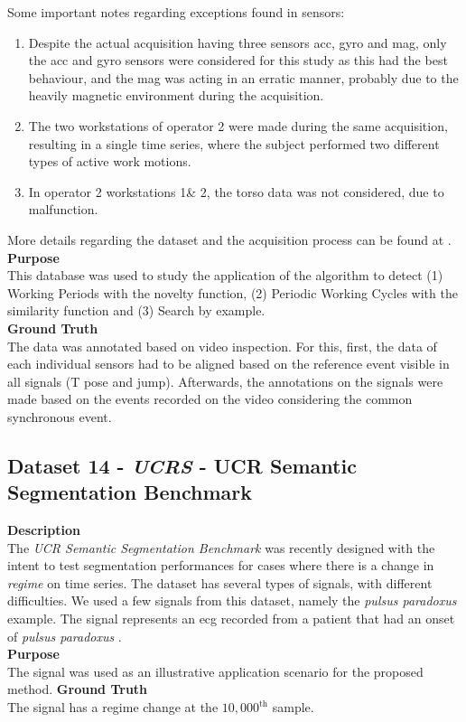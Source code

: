 Some important notes regarding exceptions found in sensors:
\begin{enumerate}
\item Despite the actual acquisition having three sensors \gls{acc}, \gls{gyro} and \gls{mag}, only the \gls{acc} and \gls{gyro} sensors were considered for this study as this had the best behaviour, and the \gls{mag} was acting in an erratic manner, probably due to the heavily magnetic environment during the acquisition.
\item The two workstations of operator 2 were made during the same acquisition, resulting in a single time series, where the subject performed two different types of active work motions.
\item In operator 2 workstations 1\& 2, the torso data was not considered, due to malfunction.
\end{enumerate}

More details regarding the dataset and the acquisition process can be found at \cite{santos2019, sara}.\\
\textbf{Purpose}\hfill \\
This database was used to study the application of the algorithm to detect (1) Working Periods with the novelty function, (2) Periodic Working Cycles with the similarity function and (3) Search by example. \\
\textbf{Ground Truth}\hfill \\
The data was annotated based on video inspection. For this, first, the data of each individual sensors had to be aligned based on the reference event visible in all signals (T pose and jump). Afterwards, the annotations on the signals were made based on the events recorded on the video considering the common synchronous event.

\subsection{Dataset 14 - \textit{UCRS} - UCR Semantic Segmentation Benchmark}
\label{dat:dataset15}

\textbf{Description}\\
The \textit{UCR Semantic Segmentation Benchmark} \cite{eamonn_segmentation} was recently designed with the intent to test segmentation performances for cases where there is a change in \textit{regime} on time series. The dataset has several types of signals, with different difficulties. We used a few signals from this dataset, namely the \textit{pulsus paradoxus} example. The signal represents an \gls{ecg} recorded from a patient that had an onset of \textit{pulsus paradoxus} \cite{pulsusparadoxus, pulsusparadoxus2}.\\
\textbf{Purpose}\\
The signal was used as an illustrative application scenario for the proposed method.
\textbf{Ground Truth}\\
The signal has a regime change at the $10,000^\text{th}$ sample.\\

